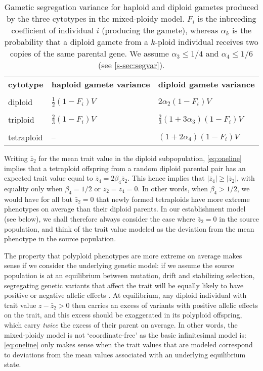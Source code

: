 \documentclass[12pt,a4paper]{article}
\begin{document}
    \begin{table}[t]
    \caption{Gametic segregation variance for haploid and diploid gametes produced
    by the three cytotypes in the mixed-ploidy model. $F_i$ is the inbreeding
    coefficient of individual $i$ (producing the gamete), whereas $\alpha_k$ is the
    probability that a diploid gamete from a $k$-ploid individual receives two
    copies of the same parental gene. We assume $\alpha_3 \le 1/4$ and
        $\alpha_4 \le 1/6$ (see \cref{s-sec:segvar}).
    } \label{tbl:segvar}
    \centering
    \small
    \begin{tabularx}{\linewidth}{XXX}
    \cline{1-3}
    \textbf{cytotype}   & \textbf{haploid gamete variance} & \textbf{diploid gamete
    variance}        \\ \cline{1-3} \\[-2.5ex]
    diploid    & $\frac{1}{2}(1-F_i)V$    & $2\alpha_2(1-F_i)V$  \\ \\[-2.5ex]
    triploid   & $\frac{2}{3}(1-F_i)V$     & $\frac{2}{3}(1 + 3\alpha_3)(1-F_i)V$ \\ \\[-2.5ex]
    tetraploid & --                      & $(1+2\alpha_4)(1-F_i)V$             \\
    \cline{1-3}
    \end{tabularx}%
    \end{table}

    Writing $\bar{z}_2$ for the mean trait value in the diploid subpopulation,
    \cref{eq:oneline} implies that a tetraploid offspring from a random diploid
    parental pair has an expected trait value equal to $\bar{z}_4 =
    2\beta_4\bar{z}_2$.
    This hence implies that $|\bar{z}_4| \ge |\bar{z}_2|$, with equality only when
    $\beta_4=1/2$ or $\bar{z}_2 = \bar{z}_4 = 0$. 
    In other words, when $\beta_4 > 1/2$, we would have for all but $\bar{z}_2 = 0$
    that newly formed tetraploids have more extreme phenotypes on average than
    their diploid parents.
    In our establishment model (see below), we shall therefore always consider 
    the case where $\bar{z}_2=0$ in the source population, and think of the trait
    value modeled as the deviation from the mean phenotype in the source
    population.

    The property that polyploid phenotypes are more extreme on average makes sense
    if we consider the underlying genetic model: if we assume the source population
    is at an equilibrium between mutation, drift and stabilizing selection,
    segregating genetic variants that affect the trait will be equally likely to
    have positive or negative allelic effects \citep{hayward2022}.
    At equilibrium, any diploid individual with trait value $z - \bar{z}_2 > 0$
    then carries an excess of variants with positive allelic effects on the trait,
    and this excess should be exaggerated in its polyploid offspring, which carry
    \textit{twice} the excess of their parent on average.
    In other words, the mixed-ploidy model is not `coordinate-free' as the basic
    infinitesimal model is: \cref{eq:oneline} only makes sense when the trait
    values that are modeled correspond to deviations from the mean values
    associated with an underlying equilibrium state.
\end{document}
